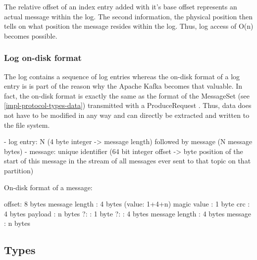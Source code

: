 The relative offset of an index entry added with it's base offset represents an
actual message within the log. The second information, the physical position then tells on what 
position the message resides within the log. Thus, log access of O(n) becomes possible.

\subsubsection{Log on-disk format}

The log contains a sequence of log entries whereas the on-disk format of a log
entry is is part of the reason why the Apache Kafka becomes that valuable. In
fact, the on-disk format is exactly the same as the format of the MessageSet
(see \ref{impl-protocol-types-data}) transmitted with a ProduceRequest
. Thus, data does not have to be
modified in any way and can directly be extracted and written to the file
system.

- log entry: N (4 byte integer -> message length) followed by message (N message bytes)
- message: unique identifier (64 bit integer offset -> byte position of the start of this message in the stream of all messages ever sent to that topic on that partition)

On-disk format of a message:

offset: 8 bytes
message length : 4 bytes (value: 1+4+n) 
magic value  : 1 byte
crc            : 4 bytes
payload        : n bytes
    ?:              : 1 byte
    ?:              : 4 bytes
    message length  : 4 bytes
    message         : n bytes

\subsection{Types}

